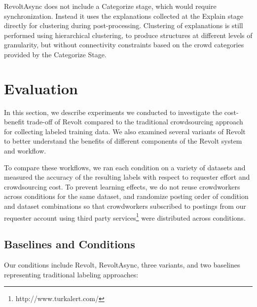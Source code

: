 RevoltAsync does not include a Categorize stage, which would require synchronization. Instead it uses the explanations collected at the Explain stage directly for clustering during post-processing. Clustering of explanations is still performed using hierarchical clustering, to produce structures at different levels of granularity, but without connectivity constraints based on the crowd categories provided by the Categorize Stage.



\section{Evaluation}

In this section, we describe experiments we conducted to investigate the cost-benefit trade-off of Revolt compared to the traditional crowdsourcing approach for collecting labeled training data. We also examined several variants of Revolt to better understand the benefits of different components of the Revolt system and workflow. 

To compare these workflows, we ran each condition on a variety of datasets and measured the accuracy of the resulting labels with respect to requester effort and crowdsourcing cost. To prevent learning effects, we do not reuse crowdworkers across conditions for the same dataset, and randomize posting order of condition and dataset combinations so that crowdworkers subscribed to postings from our requester account using third party services\footnote{http://www.turkalert.com/} were distributed across conditions.

\subsection{Baselines and Conditions}

Our conditions include Revolt, RevoltAsync, three variants, and two baselines representing traditional labeling approaches:

